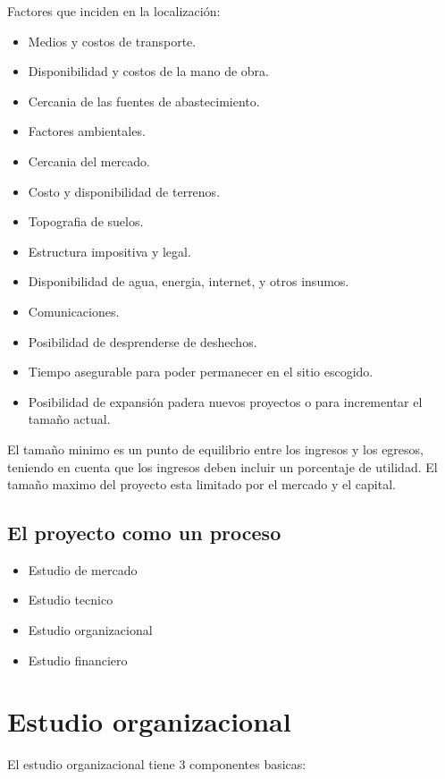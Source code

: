 \documentclass[a4paper, 11pt, oneside]{article}
\begin{document}
Factores que inciden en la localización:

\begin{itemize}
	\item Medios y costos de transporte.
	\item Disponibilidad y costos de la mano de obra.
	\item Cercania de las fuentes de abastecimiento.
	\item Factores ambientales.
	\item Cercania del mercado.
	\item Costo y disponibilidad de terrenos.
	\item Topografia de suelos.
	\item Estructura impositiva y legal.
	\item Disponibilidad de agua, energia, internet, y otros insumos.
	\item Comunicaciones.
	\item Posibilidad de desprenderse de deshechos.
	\item Tiempo asegurable para poder permanecer en el sitio escogido.
	\item Posibilidad de expansión padera nuevos proyectos o para incrementar el tamaño actual.
\end{itemize} 

El tamaño minimo es un punto de equilibrio entre los ingresos y los egresos, teniendo en cuenta que los ingresos deben incluir un 
porcentaje de utilidad. El tamaño maximo del proyecto esta limitado por el mercado y el capital.

\subsection{El proyecto como un proceso}

\begin{itemize}
	\item Estudio de mercado
	\item Estudio tecnico
	\item Estudio organizacional
	\item Estudio financiero
\end{itemize}

\section{Estudio organizacional}

El estudio organizacional tiene 3 componentes basicas:
\end{document}
